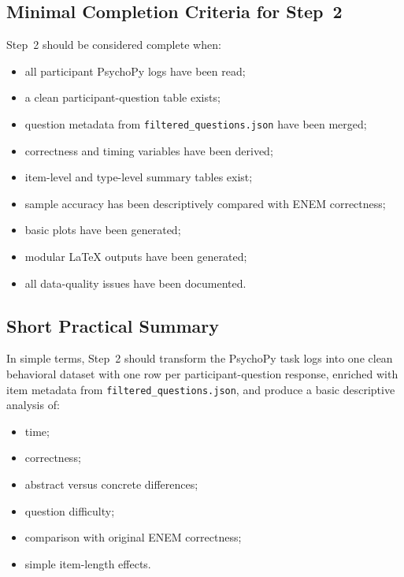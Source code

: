 \subsection{Minimal Completion Criteria for Step~2}
Step~2 should be considered complete when:
\begin{itemize}
    \item all participant PsychoPy logs have been read;
    \item a clean participant-question table exists;
    \item question metadata from \texttt{filtered\_questions.json} have been merged;
    \item correctness and timing variables have been derived;
    \item item-level and type-level summary tables exist;
    \item sample accuracy has been descriptively compared with ENEM correctness;
    \item basic plots have been generated;
    \item modular \LaTeX{} outputs have been generated;
    \item all data-quality issues have been documented.
\end{itemize}

\subsection{Short Practical Summary}
In simple terms, Step~2 should transform the PsychoPy task logs into one clean behavioral dataset with one row per participant-question response, enriched with item metadata from \texttt{filtered\_questions.json}, and produce a basic descriptive analysis of:
\begin{itemize}
    \item time;
    \item correctness;
    \item abstract versus concrete differences;
    \item question difficulty;
    \item comparison with original ENEM correctness;
    \item simple item-length effects.
\end{itemize}
